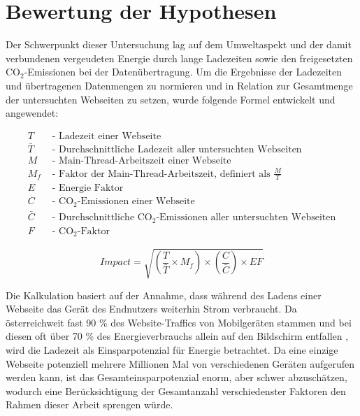 \documentclass[Bachelor,BIF,german,IEEE]{BASE/twbook}
\begin{document}
\clearpage 



\section{Bewertung der Hypothesen}
\noindent Der Schwerpunkt dieser Untersuchung lag auf dem Umweltaspekt und der damit verbundenen vergeudeten Energie durch lange Ladezeiten sowie den freigesetzten CO$_2$-Emissionen bei der Datenübertragung. Um die Ergebnisse der Ladezeiten und übertragenen Datenmengen zu normieren und in Relation zur Gesamtmenge der untersuchten Webseiten zu setzen, wurde folgende Formel entwickelt und angewendet:


\begin{align*}
T & \text{ - Ladezeit einer Webseite} \\
\bar{T} & \text{ - Durchschnittliche Ladezeit aller untersuchten Webseiten} \\
M & \text{ - Main-Thread-Arbeitszeit einer Webseite} \\
M_f & \text{ - Faktor der Main-Thread-Arbeitszeit, definiert als } \frac{M}{T} \\
E & \text{ - Energie Faktor} \\
C & \text{ - CO}_2\text{-Emissionen einer Webseite} \\
\bar{C} & \text{ - Durchschnittliche CO}_2\text{-Emissionen aller untersuchten Webseiten} \\
F & \text{ - CO}_2\text{-Faktor}
\end{align*}

\[
Impact = \sqrt{\left( \frac{T}{\bar{T}} \times M_f \right) \times \left( \frac{C}{\bar{C}} \right) \times EF}
\]

\noindent Die Kalkulation basiert auf der Annahme, dass während des Ladens einer Webseite das Gerät des Endnutzers weiterhin Strom verbraucht. Da österreichweit fast 90 \% des Website-Traffics von Mobilgeräten stammen  \cite{Stat21} und bei diesen oft über 70 \% des Energieverbrauchs allein auf den Bildschirm entfallen  \cite{Argos24}, wird die Ladezeit als Einsparpotenzial für Energie betrachtet. Da eine einzige Webseite potenziell mehrere Millionen Mal von verschiedenen Geräten aufgerufen werden kann, ist das Gesamteinsparpotenzial enorm, aber schwer abzuschätzen, wodurch eine Berücksichtigung der Gesamtanzahl verschiedenster Faktoren den Rahmen dieser Arbeit sprengen würde. \newline
\end{document}
